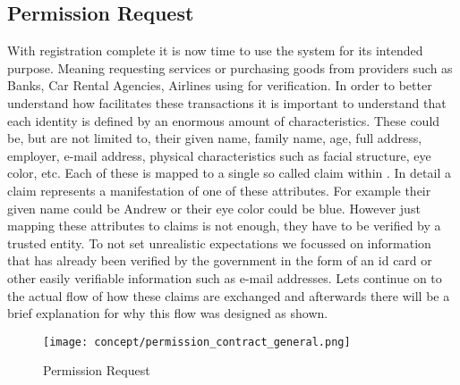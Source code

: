 \subsection{Permission Request}
\label{ssec:PermReq}
With registration complete it is now time to use the system for its intended purpose. Meaning requesting services or purchasing goods from providers such as Banks, 
Car Rental Agencies, Airlines using \projectName{} for verification. In order to better understand how \projectName{} facilitates these transactions it is important to understand that
each identity is defined by an enormous amount of characteristics. These could be, but are not limited to, their given name, family name, age, full address, employer, e-mail address, physical characteristics such as facial structure, eye color, etc.
Each of these is mapped to a single so called claim within \projectName{}. In detail a claim represents a manifestation of one of these attributes. For example their given name could be Andrew or their eye color could be blue.
However just mapping these attributes to claims is not enough, they have to be verified by a trusted entity. To not set unrealistic expectations we focussed on information that has already been verified by the government in the form of an id card or other easily verifiable information such as
e-mail addresses. Lets continue on to the actual flow of how these claims are exchanged and afterwards there will be a brief explanation for why this flow was designed as shown. 

\begin{figure}[ht]
\centering
\texttt{[image: concept/permission\_contract\_general.png]}
\caption{Permission Request}
\label{fig:permission_request}
\end{figure}

